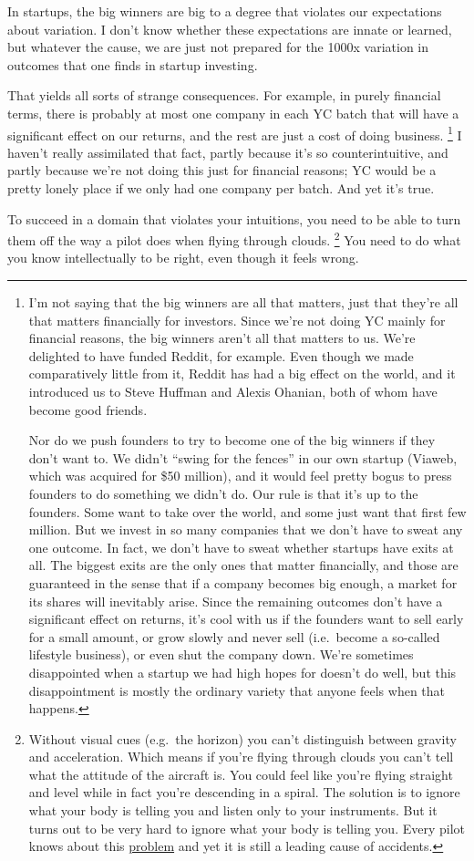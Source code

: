 \documentclass[12pt]{book}
\begin{document}
In startups, the big winners are big to a degree that violates our
expectations about variation. I don't know whether these expectations
are innate or learned, but whatever the cause, we are just not prepared
for the 1000x variation in outcomes that one finds in startup investing.

That yields all sorts of strange consequences. For example, in purely
financial terms, there is probably at most one company in each YC batch
that will have a significant effect on our returns, and the rest are
just a cost of doing business. \footnote{I'm not saying that the big winners are all that matters, just
that they're all that matters financially for investors. Since we're not
doing YC mainly for financial reasons, the big winners aren't all that
matters to us. We're delighted to have funded Reddit, for example. Even
though we made comparatively little from it, Reddit has had a big effect
on the world, and it introduced us to Steve Huffman and Alexis Ohanian,
both of whom have become good friends.

Nor do we push founders to try to become one of the big winners if they
don't want to. We didn't ``swing for the fences'' in our own startup
(Viaweb, which was acquired for \$50 million), and it would feel pretty
bogus to press founders to do something we didn't do. Our rule is that
it's up to the founders. Some want to take over the world, and some just
want that first few million. But we invest in so many companies that we
don't have to sweat any one outcome. In fact, we don't have to sweat
whether startups have exits at all. The biggest exits are the only ones
that matter financially, and those are guaranteed in the sense that if a
company becomes big enough, a market for its shares will inevitably
arise. Since the remaining outcomes don't have a significant effect on
returns, it's cool with us if the founders want to sell early for a
small amount, or grow slowly and never sell (i.e.~become a so-called
lifestyle business), or even shut the company down. We're sometimes
disappointed when a startup we had high hopes for doesn't do well, but
this disappointment is mostly the ordinary variety that anyone feels
when that happens.} I haven't really
assimilated that fact, partly because it's so counterintuitive, and
partly because we're not doing this just for financial reasons; YC would
be a pretty lonely place if we only had one company per batch. And yet
it's true.

To succeed in a domain that violates your intuitions, you need to be
able to turn them off the way a pilot does when flying through clouds.
\footnote{Without visual cues (e.g.~the horizon) you can't distinguish
between gravity and acceleration. Which means if you're flying through
clouds you can't tell what the attitude of the aircraft is. You could
feel like you're flying straight and level while in fact you're
descending in a spiral. The solution is to ignore what your body is
telling you and listen only to your instruments. But it turns out to be
very hard to ignore what your body is telling you. Every pilot knows
about this
\href{http://en.wikipedia.org/wiki/Spatial_disorientation}{problem} and
yet it is still a leading cause of accidents.} You need to do what you know intellectually to
be right, even though it feels wrong.
\end{document}
